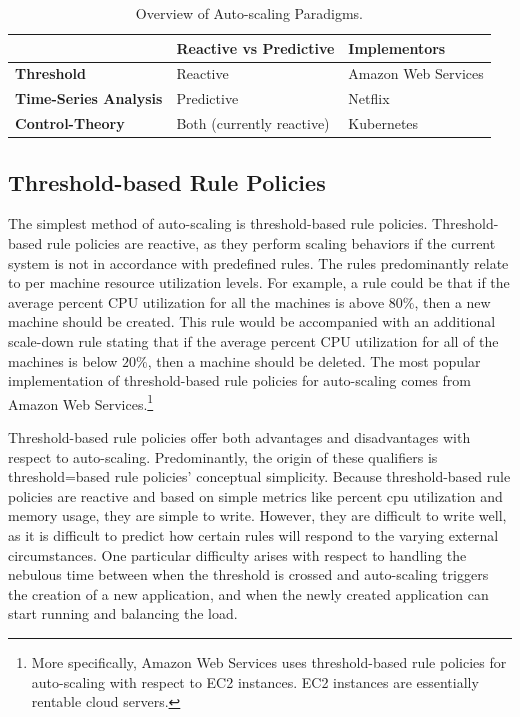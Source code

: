 \documentclass[twoside]{report}
\begin{document}

\begin{table}[]
\centering
\caption{Overview of Auto-scaling Paradigms.}
\begin{tabular}{|l|l|l|}
\hline
                    & \textbf{Reactive vs Predictive} & \textbf{Implementors} \\ \hline
\textbf{Threshold}  & Reactive                        & Amazon Web Services   \\ \hline
\textbf{Time-Series Analysis} & Predictive            & Netflix               \\ \hline
\textbf{Control-Theory} & Both (currently reactive)   & Kubernetes            \\ \hline
\end{tabular}
\end{table}


\subsection{Threshold-based Rule Policies}

The simplest method of auto-scaling is threshold-based rule policies.
Threshold-based rule policies are reactive, as they perform scaling behaviors if
the current system is not in accordance with predefined rules. The rules
predominantly relate to per machine resource utilization levels. For example, a
rule could be that if the average percent CPU utilization for all the
machines is above $80\%$, then a new machine should be created. This rule would
be accompanied with an additional scale-down rule stating that if the average
percent CPU utilization for all of the machines is below $20\%$, then a machine
should be deleted. The most popular implementation of threshold-based rule
policies for auto-scaling comes from Amazon Web Services.\footnote{More
specifically, Amazon Web Services uses threshold-based rule policies for
auto-scaling with respect to EC2 instances. EC2 instances are essentially
rentable cloud
servers.\cite{amazon-ec2}}\cite{amazon-auto-scaling-developer-guide}

Threshold-based rule policies offer both advantages and disadvantages with
respect to auto-scaling. Predominantly, the origin of these qualifiers is
threshold=based rule policies' conceptual simplicity.
Because threshold-based rule policies are reactive and based on simple metrics
like percent cpu utilization and memory usage, they are simple to write.
However, they are difficult to write well, as it is difficult to predict how
certain rules will respond to the varying external circumstances. One particular
difficulty arises with respect to handling the nebulous time between when the
threshold is crossed and auto-scaling triggers the creation of a new
application, and when the newly created application can start running and
balancing the load.
\end{document}
